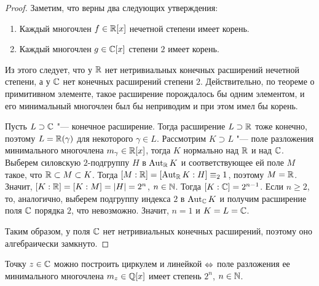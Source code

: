 \begin{proof}
	Заметим, что верны два следующих утверждения:
	\begin{enumerate}
		\item Каждый многочлен $f \in \mathbb{R}[x]$ нечетной степени имеет корень.
		\item Каждый многочлен $g \in \mathbb{C}[x]$ степени $2$ имеет корень.
	\end{enumerate}

	Из этого следует, что у $\mathbb{R}$ нет нетривиальных конечных расширений нечетной степени, а у $\mathbb{C}$ нет конечных расширений степени $2$. Действительно, по теореме о примитивном элементе, такое расширение порождалось бы одним элементом, и его минимальный многочлен был бы неприводим и при этом имел бы корень.
	
	Пусть $L \supset \mathbb{C}$ "--- конечное расширение. Тогда расширение $L \supset \mathbb{R}$ тоже конечно, поэтому $L = \mathbb{R}(\gamma)$ для некоторого $\gamma \in L$. Рассмотрим $K \supset L$ "--- поле разложения минимального многочлена $m_\gamma \in \mathbb{R}[x]$, тогда $K$ нормально над $\mathbb{R}$ и над $\mathbb{C}$. Выберем силовскую $2$-подгруппу $H$ в $\operatorname{Aut}_{\mathbb{R}}K$ и соответствующее ей поле $M$ такое, что $\mathbb{R} \subset M \subset K$. Тогда $[M : \R] \hm= [\Aut_{\R}K : H] \equiv_2 1$, поэтому $M = \mathbb{R}$. Значит, $[K : \mathbb{R}] = [K : M] = |H| = 2^n$, $n \in \mathbb{N}$. Тогда $[K : \mathbb{C}] = 2^{n - 1}$. Если $n \ge 2$, то, аналогично, выберем подгруппу индекса $2$ в $\operatorname{Aut}_{\mathbb{C}}K$ и получим расширение поля $\mathbb{C}$ порядка $2$, что невозможно. Значит, $n = 1$ и $K = L = \mathbb{C}$.
	
	Таким образом, у поля $\mathbb{C}$ нет нетривиальных конечных расширений, поэтому оно алгебраически замкнуто.
\end{proof}

\begin{theorem}
	Точку $z \in \mathbb{C}$ можно построить циркулем и линейкой $\Leftrightarrow$ поле разложения ее минимального многочлена $m_{z} \in \mathbb{Q}[x]$ имеет степень $2^n$, $n \in \mathbb{N}$.
\end{theorem}

